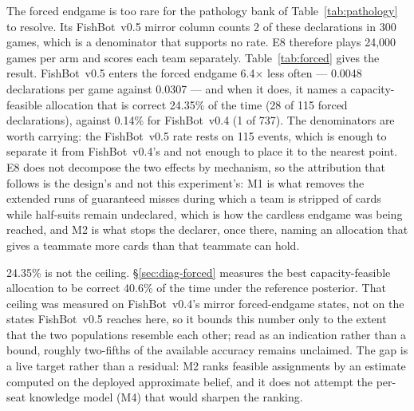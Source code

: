 \documentclass[11pt]{article}
\theoremstyle{definition}
\DeclareRobustCommand{\vfive}{\texorpdfstring{\mbox{FishBot v0.5}}{FishBot v0.5}}
\DeclareRobustCommand{\vfour}{\texorpdfstring{\mbox{FishBot v0.4}}{FishBot v0.4}}
\providecommand{\numFeasibleRight}{40.6}
\providecommand{\numVfiveForcedAcc}{24.35}
\providecommand{\numVfourForcedAcc}{0.14}
\providecommand{\numForcedRateRatio}{6.4}
\providecommand{\numForcedEightGames}{24{,}000}
\providecommand{\numFiveForced}{2}
\providecommand{\numFiveGames}{300}
\providecommand{\numVfiveForcedRate}{0.0048}
\providecommand{\numVfourForcedRate}{0.0307}
\providecommand{\numVfiveForcedN}{115}
\providecommand{\numVfiveForcedRightN}{28}
\providecommand{\numVfourForcedN}{737}
\providecommand{\numVfourForcedRightN}{1}
\begin{document}
The forced endgame is too rare for the pathology bank of
Table~\ref{tab:pathology} to resolve. Its \vfive{} mirror column counts
\numFiveForced{} of these declarations in \numFiveGames{} games, which is a
denominator that supports no rate. E8 therefore plays
\numForcedEightGames{} games per arm and scores each team separately.
Table~\ref{tab:forced} gives the result. \vfive{} enters the forced endgame
\numForcedRateRatio$\times$ less often --- \numVfiveForcedRate{} declarations per
game against \numVfourForcedRate{} --- and when it does, it names a
capacity-feasible allocation that is correct \numVfiveForcedAcc\% of the time
(\numVfiveForcedRightN{} of \numVfiveForcedN{} forced declarations), against
\numVfourForcedAcc\% for \vfour{} (\numVfourForcedRightN{} of
\numVfourForcedN{}). The denominators are worth carrying: the \vfive{} rate rests
on \numVfiveForcedN{} events, which is enough to separate it from \vfour{}'s and
not enough to place it to the nearest point. E8 does not decompose the two
effects by mechanism, so the attribution that follows is the design's and not
this experiment's: M1 is what removes the extended runs of guaranteed misses
during which a team is stripped of cards while half-suits remain undeclared,
which is how the cardless endgame was being reached, and M2 is what stops the
declarer, once there, naming an allocation that gives a teammate more cards than
that teammate can hold.

\numVfiveForcedAcc\% is not the ceiling. \S\ref{sec:diag-forced} measures the best
capacity-feasible allocation to be correct \numFeasibleRight\% of the time under
the reference posterior. That ceiling was measured on \vfour{}'s mirror
forced-endgame states, not on the states \vfive{} reaches here, so it bounds this
number only to the extent that the two populations resemble each other; read as
an indication rather than a bound, roughly two-fifths of the available accuracy
remains unclaimed. The gap is a live target rather than a residual: M2 ranks
feasible assignments by an estimate computed on the deployed approximate belief,
and it does not attempt the per-seat knowledge model (M4) that would sharpen the
ranking.
\end{document}
